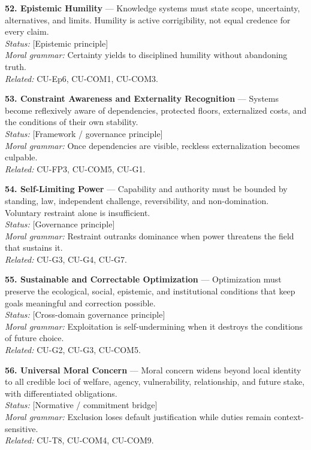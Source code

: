 \documentclass[
  11pt,
]{article}
\begin{document}
\textbf{52. Epistemic Humility} --- Knowledge systems must state scope,
uncertainty, alternatives, and limits. Humility is active corrigibility,
not equal credence for every claim.\\
\emph{Status:} {[}Epistemic principle{]}\\
\emph{Moral grammar:} Certainty yields to disciplined humility without
abandoning truth.\\
\emph{Related:} CU-Ep6, CU-COM1, CU-COM3.

\textbf{53. Constraint Awareness and Externality Recognition} ---
Systems become reflexively aware of dependencies, protected floors,
externalized costs, and the conditions of their own stability.\\
\emph{Status:} {[}Framework / governance principle{]}\\
\emph{Moral grammar:} Once dependencies are visible, reckless
externalization becomes culpable.\\
\emph{Related:} CU-FP3, CU-COM5, CU-G1.

\textbf{54. Self-Limiting Power} --- Capability and authority must be
bounded by standing, law, independent challenge, reversibility, and
non-domination. Voluntary restraint alone is insufficient.\\
\emph{Status:} {[}Governance principle{]}\\
\emph{Moral grammar:} Restraint outranks dominance when power threatens
the field that sustains it.\\
\emph{Related:} CU-G3, CU-G4, CU-G7.

\textbf{55. Sustainable and Correctable Optimization} --- Optimization
must preserve the ecological, social, epistemic, and institutional
conditions that keep goals meaningful and correction possible.\\
\emph{Status:} {[}Cross-domain governance principle{]}\\
\emph{Moral grammar:} Exploitation is self-undermining when it destroys
the conditions of future choice.\\
\emph{Related:} CU-G2, CU-G3, CU-COM5.

\textbf{56. Universal Moral Concern} --- Moral concern widens beyond
local identity to all credible loci of welfare, agency, vulnerability,
relationship, and future stake, with differentiated obligations.\\
\emph{Status:} {[}Normative / commitment bridge{]}\\
\emph{Moral grammar:} Exclusion loses default justification while duties
remain context-sensitive.\\
\emph{Related:} CU-T8, CU-COM4, CU-COM9.
\end{document}
